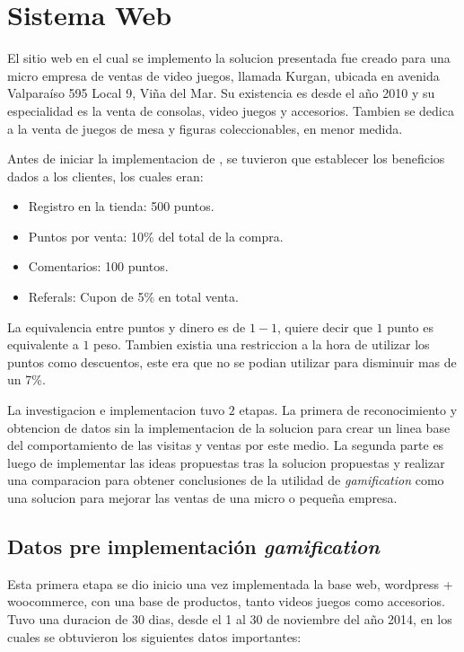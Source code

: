 \section{Sistema Web}

El sitio web en el cual se implemento la solucion presentada fue creado para una micro empresa de
ventas de video juegos, llamada Kurgan, ubicada en avenida Valparaíso 595 Local 9, Viña del Mar.
Su existencia es desde el año 2010 y su especialidad es la venta de consolas, video juegos y
accesorios. Tambien se dedica a la venta de juegos de mesa y figuras coleccionables, en menor medida.

Antes de iniciar la implementacion de {\GAM}, se tuvieron que establecer los beneficios dados a los 
clientes, los cuales eran:

\begin{itemize}

\item Registro en la tienda: 500 puntos.
\item Puntos por venta: 10\% del total de la compra.
\item Comentarios: 100 puntos.
\item Referals: Cupon de 5\% en total venta.

\end{itemize}

La equivalencia entre puntos y dinero es de $1-1$, quiere decir que $1$ punto es equivalente a 
$1$ peso. Tambien existia una restriccion a la hora de utilizar los puntos como descuentos, este 
era que no se podian utilizar para disminuir mas de un 7\%.

La investigacion e implementacion tuvo $2$ etapas. La primera de reconocimiento y obtencion de 
datos sin la implementacion de la solucion para crear un linea base del comportamiento de las visitas
y ventas por este medio. La segunda parte es luego de implementar las ideas propuestas tras la solucion
propuestas y realizar una comparacion para obtener conclusiones de la utilidad de \emph{gamification}
como una solucion para mejorar las ventas de una micro o pequeña empresa.

\subsection{Datos pre implementación \emph{gamification}}
 
Esta primera etapa se dio inicio una vez implementada la base web, wordpress + woocommerce, con
una base de productos, tanto videos juegos como accesorios. Tuvo una duracion de 30 dias, desde el 1
 al 30 de noviembre del año 2014, en los cuales se obtuvieron los siguientes datos importantes:

